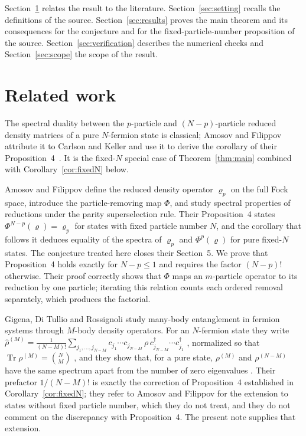 \documentclass[11pt,a4paper]{article}
\theoremstyle{definition}
\theoremstyle{plain}
\DeclareMathOperator{\Tr}{Tr}
\begin{document}
Section~\ref{sec:related} relates the result to the literature.
Section~\ref{sec:setting} recalls the definitions of the source.
Section~\ref{sec:results} proves the main theorem and its consequences for
the conjecture and for the fixed-particle-number proposition of the source.
Section~\ref{sec:verification} describes the numerical checks and
Section~\ref{sec:scope} the scope of the result.

\section{Related work}\label{sec:related}
The spectral duality between the $p$-particle and $(N-p)$-particle reduced
density matrices of a pure $N$-fermion state is classical; Amosov and
Filippov attribute it to Carlson and Keller and use it to derive the
corollary of their Proposition~4~\cite{AmosovFilippov2017}. It is the
fixed-$N$ special case of Theorem~\ref{thm:main} combined with
Corollary~\ref{cor:fixedN} below.

Amosov and Filippov \cite{AmosovFilippov2017} define the reduced density
operator $\varrho_p$ on the full Fock space, introduce the particle-removing
map $\Phi$, and study spectral properties of reductions under the parity
superselection rule. Their Proposition~4 states
$\Phi^{N-p}(\varrho)=\varrho_p$ for states with fixed particle number $N$,
and the corollary that follows it deduces equality of the spectra of
$\varrho_p$ and $\Phi^p(\varrho)$ for pure fixed-$N$ states. The conjecture
treated here closes their Section~5. We prove that Proposition~4 holds
exactly for $N-p\le1$ and requires the factor $(N-p)!$ otherwise. Their proof
correctly shows that $\Phi$ maps an $m$-particle operator to its reduction by
one particle; iterating this relation counts each ordered removal separately,
which produces the factorial.

Gigena, Di Tullio and Rossignoli \cite{Gigena2021} study many-body
entanglement in fermion systems through $M$-body density operators. For an
$N$-fermion state they write
$\hat\rho^{(M)}=\frac{1}{(N-M)!}\sum_{j_1,\dots,j_{N-M}}c_{j_1}\cdots
c_{j_{N-M}}\,\rho\,c^\dagger_{j_{N-M}}\cdots c^\dagger_{j_1}$
\cite[Eq.~(79)]{Gigena2021}, normalized so that $\Tr\rho^{(M)}=\binom NM$
\cite[Eq.~(16)]{Gigena2021}, and they show that, for a pure state,
$\rho^{(M)}$ and $\rho^{(N-M)}$ have the same spectrum apart from the number
of zero eigenvalues \cite[Sec.~II\,B]{Gigena2021}. Their prefactor
$1/(N-M)!$ is exactly the correction of Proposition~4 established in
Corollary~\ref{cor:fixedN}; they refer to Amosov and Filippov for the
extension to states without fixed particle number, which they do not treat,
and they do not comment on the discrepancy with Proposition~4. The present
note supplies that extension.
\end{document}
